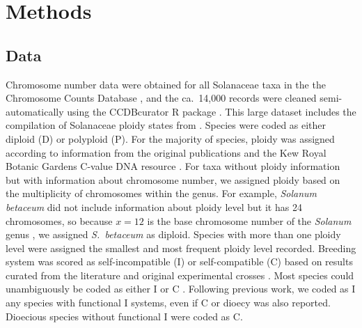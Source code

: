 \section{Methods}

\subsection{Data}

Chromosome number data were obtained for all Solanaceae taxa in the the Chromosome Counts Database \citep[CCDB;][]{rice_2015}, and the ca.~14,000 records were cleaned semi-automatically using the CCDBcurator R package \citep{rivero_2019}. %
This large dataset includes the compilation of Solanaceae ploidy states from \citet{robertson_2011}.
Species were coded as either diploid (D) or polyploid (P).
For the majority of species, ploidy was assigned according to information from the original publications and the Kew Royal Botanic Gardens C-value DNA resource \citep{bennett_2005}.
For taxa without ploidy information but with information about chromosome number, we assigned ploidy based on the multiplicity of chromosomes within the genus.
For example, \textit{Solanum betaceum} did not include information about ploidy level but it has 24 chromosomes, so because $x=12$ is the base chromosome number of the \textit{Solanum} genus \citep{olmstead_2007}, we assigned \textit{S.~betaceum} as diploid. 
Species with more than one ploidy level were assigned the smallest and most frequent ploidy level recorded.
%
Breeding system was scored as self-incompatible (I) or self-compatible (C) based on results curated from the literature and  original experimental crosses \citep[as compiled in][]{igic_2006, goldberg_2010, robertson_2011, goldberg_2012}.
Most species could unambiguously be coded as either I or C \citep{raduski_2012}.
Following previous work, we coded as I any species with functional I systems, even if C or dioecy was also reported.
Dioecious species without functional I were coded as C.

%

